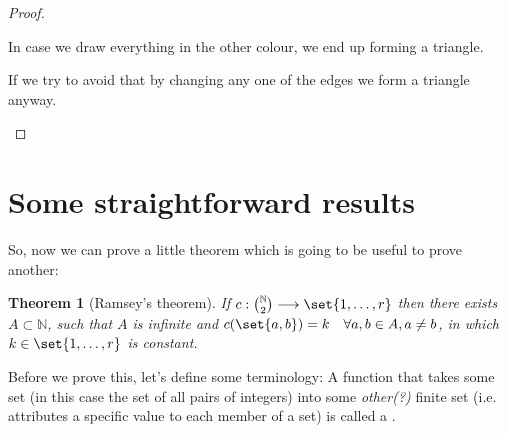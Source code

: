\documentclass[english, dark, index]{Iart}
\newtheorem{theorem}{Theorem}[part]
\begin{document}
\begin{proof}
\begin{multi}
		
			\medskip
			
			In case we draw everything in the other colour, we end up forming a triangle.
			
			\nextcol
			
			\centering
		
			\medskip
			
			If we try to avoid that by changing any one of the edges we form a triangle anyway.
			
		\end{multi}
	\end{proof}


	\section{Some straightforward results}

	So, now we can prove a little theorem which is going to be useful to prove another:
	\begin{theorem}[Ramsey's theorem]\label{thm:ramsey}
		If $ c:\binom{\mathbb{N}}{2}\longrightarrow \set{1,\ldots,r} $ then there exists $ A\subset\mathbb{N} $, such that $ A $ is infinite and $ c(\set{a,b})=k\quad\forall a,b\in A,a\neq b $, in which $ k\in\set{1,\ldots,r} $ is constant.
	\end{theorem}


	Before we prove this, let's define some terminology:
	A function that takes some set (in this case the set of all pairs of integers) into some \textit{other(?)} finite set (i.e. attributes a specific value to each member of a set) is called a .
	
\end{document}
